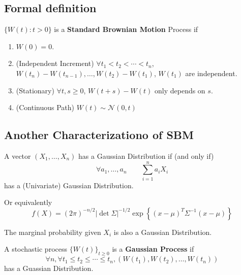     \subsection{Formal definition}
        \begin{definition}\label{def:BrownianMotionStd}
            $\{W(t):t>0\}$ is a \textbf{Standard Brownian Motion} Process if
            \begin{enumerate}
                \item $W(0) = 0$.
                \item (Independent Increment) $\forall t_1 < t_2 < \cdots < t_n$, $W(t_n)-W(t_{n-1}), \dots, W(t_2)-W(t_1)$, $W(t_1)$ are independent.
                \item (Stationary) $\forall t,s \ge 0$, $W(t+s) - W(t)$ only depends on $s$.
                \item (Continuous Path) $W(t) \sim \mathcal{N}(0, t)$
            \end{enumerate}
        \end{definition}

    \subsection{Another Characterizationo of SBM}
        \begin{definition}
            A vector $(X_1, \dots, X_n)$ has a Gaussian Distribution if (and only if)
            \[ \forall a_1, \dots, a_n \qquad \sum_{i=1}^n a_iX_i \]
            has a (Univariate) Gaussian Distribution.

            Or equivalently
            \[ f(X) = (2\pi)^{-n/2}|\det\Sigma|^{-1/2}\exp\left\{(x-\mu)^T\Sigma^{-1}(x-\mu)\right\} \]
        \end{definition}
        \begin{remark}
            The marginal probability given $X_i$ is also a Gaussian Distribution.
        \end{remark}

        \begin{definition}\label{def:GaussianProcess}
            A stochastic process $\{W(t)\}_{t \ge 0}$ is a \textbf{Gaussian Process} if
            \[ \forall n, \forall t_1 \le t_2 \le \cdots \le t_n, (W(t_1), W(t_2), \dots, W(t_n))\]
            has a Guassian Distribution.
        \end{definition}

